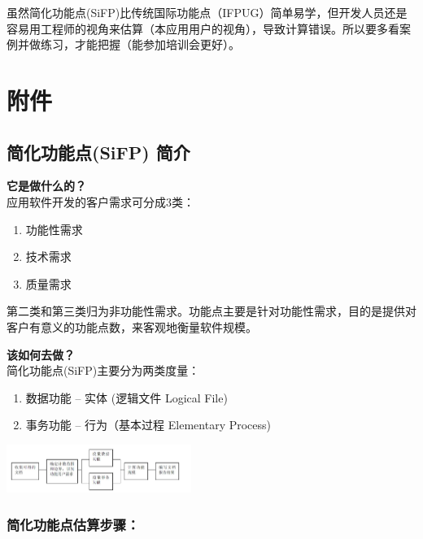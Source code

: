 虽然简化功能点(SiFP)比传统国际功能点（IFPUG）简单易学，但开发人员还是容易用工程师的视角来估算（本应用用户的视角），导致计算错误。所以要多看案例并做练习，才能把握（能参加培训会更好）。

\hypertarget{ux9644ux4ef6}{%
\section{附件}\label{ux9644ux4ef6}}

\hypertarget{ux7b80ux5316ux529fux80fdux70b9sifp-ux7b80ux4ecb}{%
\subsection{简化功能点(SiFP)
简介}\label{ux7b80ux5316ux529fux80fdux70b9sifp-ux7b80ux4ecb}}

 \textbf{它是做什么的？} \\
应用软件开发的客户需求可分成3类：

\begin{enumerate}
\tightlist
\item
  功能性需求
\item
  技术需求
\item
  质量需求
\end{enumerate}

第二类和第三类归为非功能性需求。功能点主要是针对功能性需求，目的是提供对客户有意义的功能点数，来客观地衡量软件规模。

 \textbf{该如何去做？} \\
简化功能点(SiFP)主要分为两类度量：

\begin{enumerate}
\tightlist
\item
  数据功能 -- 实体 (逻辑文件 Logical File)
\item
  事务功能 -- 行为（基本过程 Elementary Process)
\end{enumerate}


\includegraphics[width=6cm]{功能点计数过程.jpg}

\hypertarget{ux7b80ux5316ux529fux80fdux70b9ux4f30ux7b97ux6b65ux9aa4}{%
\subsubsection{简化功能点估算步骤：}\label{ux7b80ux5316ux529fux80fdux70b9ux4f30ux7b97ux6b65ux9aa4}}

